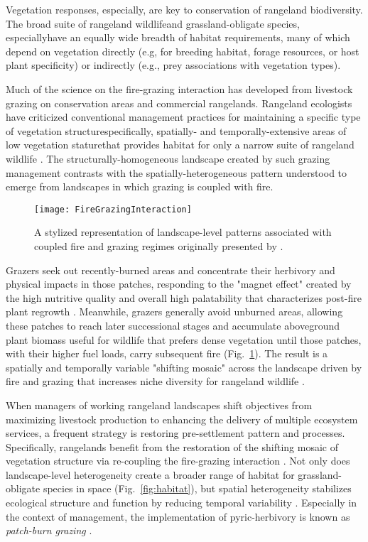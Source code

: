 Vegetation responses, especially, are key to conservation of rangeland biodiversity. 
The broad suite of rangeland wildlife\textemdash and grassland-obligate species, especially\textemdash have an equally wide breadth of habitat requirements, many of which depend on vegetation directly (e.g, for breeding habitat, forage resources, or host plant specificity) or indirectly (e.g., prey associations with vegetation types). 

Much of the science on the fire-grazing interaction has developed from livestock grazing on conservation areas and commercial rangelands. 
Rangeland ecologists have criticized conventional management practices for maintaining a specific type of vegetation structure\textemdash specifically, spatially- and temporally-extensive areas of low vegetation stature\textemdash that provides habitat for only a narrow suite of rangeland wildlife \citep{fuhlendorf2001}. 
The structurally-homogeneous landscape created by such grazing management contrasts with the spatially-heterogeneous pattern understood to emerge from landscapes in which grazing is coupled with fire. 

\begin{figure}[!t]
	\center
	\texttt{[image: FireGrazingInteraction]}
	\caption[The fire-grazing interaction]{A stylized representation of landscape-level patterns associated with coupled fire and grazing regimes originally presented by \citet{mcgranahan2013b}.}
	\label{fig:FGI}
\end{figure}

Grazers seek out recently-burned areas and concentrate their herbivory and physical impacts in those patches, responding to the "magnet effect" created by the high nutritive quality and overall high palatability that characterizes post-fire plant regrowth \citep{archibald2005, allred2011b}. 
Meanwhile, grazers generally avoid unburned areas, allowing these patches to reach later successional stages and accumulate aboveground plant biomass useful for wildlife that prefers dense vegetation until those patches, with their higher fuel loads, carry subsequent fire (Fig.~\ref{fig:FGI}). 
The result is a spatially and temporally variable "shifting mosaic" across the landscape driven by fire and grazing that increases niche diversity for rangeland wildlife \citep{fuhlendorf2004, fuhlendorf2006, hovick2014}. 

When managers of working rangeland landscapes shift objectives from maximizing livestock production to enhancing the delivery of multiple ecosystem services, a frequent strategy is restoring pre-settlement pattern and processes. 
Specifically, rangelands benefit from the restoration of the shifting mosaic of vegetation structure via re-coupling the fire-grazing interaction \citep{fuhlendorf2012}. 
Not only does landscape-level heterogeneity create a broader range of habitat for grassland-obligate species in space (Fig.~\ref{fig:habitat}), but spatial heterogeneity stabilizes ecological structure and function by reducing temporal variability \citep{fuhlendorf2017}. 
Especially in the context of management, the implementation of pyric-herbivory is known as \emph{patch-burn grazing} \citep{fuhlendorf2004, mcgranahan2012}. 

